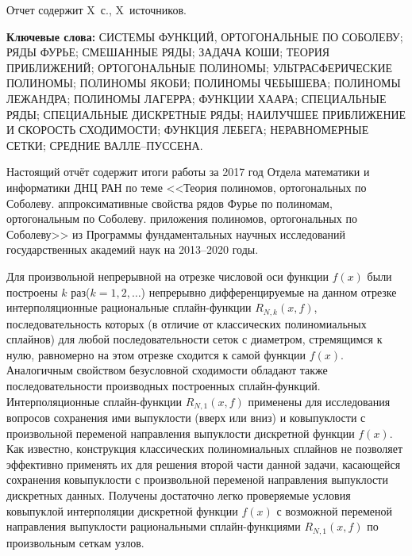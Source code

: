 \Referat %

Отчет содержит X~с., X~источников.

 \bigskip
 \textbf{ Ключевые
  слова:}
  СИСТЕМЫ ФУНКЦИЙ, ОРТОГОНАЛЬНЫЕ ПО СОБОЛЕВУ; РЯДЫ ФУРЬЕ; СМЕШАННЫЕ РЯДЫ; ЗАДАЧА КОШИ;
  ТЕОРИЯ ПРИБЛИЖЕНИЙ; ОРТОГОНАЛЬНЫЕ ПОЛИНОМЫ; УЛЬТРАСФЕРИЧЕСКИЕ ПОЛИНОМЫ; ПОЛИНОМЫ ЯКОБИ; ПОЛИНОМЫ ЧЕБЫШЕВА; ПОЛИНОМЫ ЛЕЖАНДРА; ПОЛИНОМЫ ЛАГЕРРА; ФУНКЦИИ ХААРА; СПЕЦИАЛЬНЫЕ РЯДЫ; СПЕЦИАЛЬНЫЕ ДИСКРЕТНЫЕ РЯДЫ; НАИЛУЧШЕЕ ПРИБЛИЖЕНИЕ И СКОРОСТЬ СХОДИМОСТИ; ФУНКЦИЯ ЛЕБЕГА; НЕРАВНОМЕРНЫЕ СЕТКИ; СРЕДНИЕ ВАЛЛЕ--ПУССЕНА.

 \bigskip

Настоящий отчёт содержит итоги работы за 2017 год Отдела математики и информатики ДНЦ РАН по теме
<<Теория полиномов, ортогональных по Соболеву. аппроксимативные свойства рядов Фурье по полиномам, ортогональным по Соболеву. приложения полиномов,  ортогональных по Соболеву>>
из Программы фундаментальных научных исследований государственных академий наук на 2013–2020 годы.




Для произвольной непрерывной на отрезке числовой оси функции $f(x)$  были построены $k$ раз($k=1, 2,\ldots$) непрерывно дифференцируемые на данном отрезке интерполяционные рациональные сплайн-функции $R_{N,k}(x,f)$, последовательность которых (в отличие от классических полиномиальных сплайнов) для любой последовательности сеток с диаметром, стремящимся к нулю, равномерно на этом отрезке сходится к самой функции $f(x)$.  Аналогичным свойством безусловной сходимости обладают также последовательности производных построенных сплайн-функций.
Интерполяционные сплайн-функции $R_{N,1}(x,f)$  применены для исследования вопросов сохранения ими выпуклости (вверх или вниз) и ковыпуклости  с произвольной переменой направления выпуклости дискретной функции $f(x)$. Как известно, конструкция классических полиномиальных сплайнов не позволяет эффективно применять их для решения второй части данной задачи, касающейся сохранения ковыпуклости с произвольной переменой направления выпуклости дискретных данных.     Получены достаточно легко проверяемые условия ковыпуклой интерполяции дискретной функции  $f(x)$  с возможной переменой направления выпуклости рациональными сплайн-функциями $R_{N,1}(x,f)$ по произвольным сеткам узлов.


